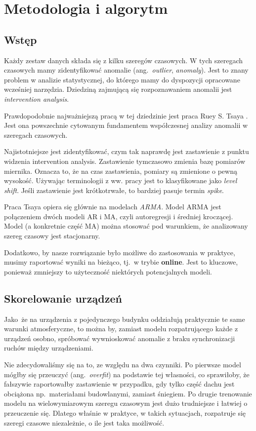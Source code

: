 \section{Metodologia i algorytm}
\subsection{Wstęp}
Każdy zestaw danych składa się z kilku szeregów czasowych. W tych szeregach czasowych mamy zidentyfikować anomalie (ang.\ \emph{outlier}, \emph{anomaly}). Jest to znany problem w analizie statystycznej, do którego mamy do dyspozycji opracowane wcześniej narzędzia. Dziedziną zajmującą się rozpoznawaniem anomalii jest \emph{intervention analysis}.

Prawdopodobnie najważniejszą pracą w tej dziedzinie jest praca Ruey S. Tsaya  \cite{https://doi.org/10.1002/for.3980070102}. Jest ona powszechnie cytowanym fundamentem współczesnej analizy anomalii w szeregach czasowych.

Najistotniejsze jest zidentyfikować, czym tak naprawdę jest zastawienie z punktu widzenia intervention analysis. Zastawienie tymczasowo zmienia bazę pomiarów miernika. Oznacza to, że na czas zastawienia, pomiary są zmienione o pewną wysokość. Używając terminologii z ww. pracy jest to klasyfikowane jako \emph{level shift}. Jeśli zastawienie jest krótkotrwałe, to bardziej pasuje termin \emph{spike}.

Praca Tsaya opiera się głównie na modelach \emph{ARMA}. Model ARMA jest połączeniem dwóch modeli AR i MA, czyli autoregresji i średniej kroczącej. Model (a konkretnie część MA) można stosować pod warunkiem, że analizowany szereg czasowy jest stacjonarny.

Dodatkowo, by nasze rozwiązanie było możliwe do zastosowania w praktyce, musimy raportować wyniki na bieżąco, tj.\ w trybie \textbf{online}. Jest to kluczowe, ponieważ zmniejszy to użyteczność niektórych potencjalnych modeli.
\subsection{Skorelowanie urządzeń}
Jako że na urządzenia z pojedynczego budynku oddziałują praktycznie te same warunki atmosferyczne, to można by, zamiast modelu rozpatrującego każde z urządzeń osobno, spróbować wywnioskować anomalie z braku synchronizacji ruchów między urządzeniami.

Nie zdecydowaliśmy się na to, ze względu na dwa czynniki. Po pierwsze model mógłby się przeuczyć (ang.\ \emph{overfit}) na podstawie tej własności, co sprawiłoby, że fałszywie raportowałby zastawienie w przypadku, gdy tylko część dachu jest obciążona np.\ materiałami budowlanymi, zamiast śniegiem. Po drugie trenowanie modelu na wielowymiarowym szeregu czasowym jest dużo trudniejsze i łatwiej o przeuczenie się. Dlatego właśnie w praktyce, w takich sytuacjach, rozpatruje się szeregi czasowe niezależnie, o ile jest taka możliwość.
